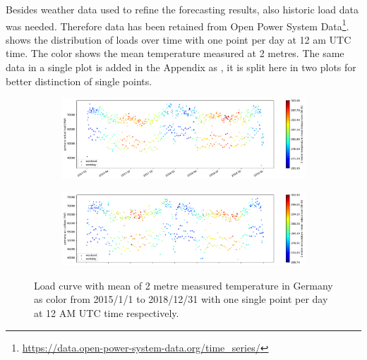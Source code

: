 Besides weather data used to refine the forecasting results, also historic load data was needed. Therefore data has been retained from Open Power System Data\footnote{\url{https://data.open-power-system-data.org/time_series/}}.  shows the distribution of loads over time with one point per day at 12 am UTC time. The color shows the mean temperature measured at 2 metres. The same data in a single plot is added in the Appendix as , it is split here in two plots for better distinction of single points.\\


\begin{figure}[H]%
	\centering
	\begin{subfigure}{.5\textwidth}
		\centering
		\includegraphics[width=2.9\textwidth,angle=-90,origin=c]{plots/plot_load_time_func/t2m_mean_18A5_2017010112_2018123112_24F}%
		\label{fig:t2m_mean_18A5_2017010112_2018123112_24F}%
	\end{subfigure}%
	\begin{subfigure}{.5\textwidth}
		\centering
		\includegraphics[width=2.9\textwidth,angle=-90,origin=c]{plots/plot_load_time_func/t2m_mean_18A5_2015010112_2016123112_24F}%
		\label{fig:t2m_mean_18A5_2015010112_2016123112_24F}%
	\end{subfigure}
	\caption{Load curve with mean of 2 metre measured temperature in Germany as color from 2015/1/1 to 2018/12/31 with one single point per day at 12 AM UTC time respectively.}
	\label{fig:t2m_mean_18A5_twofold_24F}
\end{figure}


